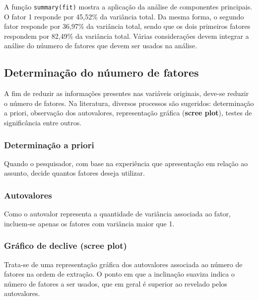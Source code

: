 \documentclass[12pt,brazil,]{book}
\begin{document}
A função \texttt{summary(fit)} mostra a aplicação da análise de
componentes principais. O fator 1 responde por 45,52\% da variância
total. Da mesma forma, o segundo fator responde por 36,97\% da variância
total, sendo que os dois primeiros fatores respondem por 82,49\% da
variância total. Várias considerações devem integrar a análise do
núumero de fatores que devem ser usados na análise.

\hypertarget{determinacao-do-nuumero-de-fatores}{%
\subsection{Determinação do núumero de
fatores}\label{determinacao-do-nuumero-de-fatores}}

A fim de reduzir as informações presentes nas variáveis originais,
deve-se reduzir o número de fatores. Na literatura, diversos processos
são sugeridos: determinação a priori, observação dos autovalores,
representação gráfica (\textbf{scree plot}), testes de significância
entre outros.

\hypertarget{determinacao-a-priori}{%
\subsubsection{Determinação a priori}\label{determinacao-a-priori}}

Quando o pesquisador, com base na experiência que apresentação em
relação ao assunto, decide quantos fatores deseja utilizar.

\hypertarget{autovalores}{%
\subsubsection{Autovalores}\label{autovalores}}

Como o autovalor representa a quantidade de variância associada ao
fator, incluem-se apenas os fatores com variância maior que 1.

\hypertarget{grafico-de-declive-scree-plot}{%
\subsubsection{\texorpdfstring{Gráfico de declive (\textbf{scree
plot})}{Gráfico de declive (scree plot)}}\label{grafico-de-declive-scree-plot}}

Trata-se de uma representação gráfica dos autovalores associada ao
número de fatores na ordem de extração. O ponto em que a inclinação
suaviza indica o número de fatores a ser usados, que em geral é superior
ao revelado pelos autovalores.
\end{document}
